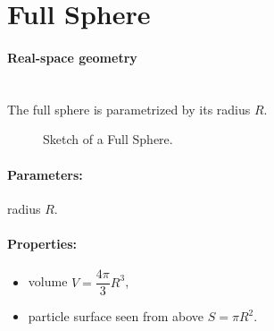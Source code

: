 
\newpage
\section{Full Sphere} 

\paragraph{Real-space geometry}\mbox{}\\
The full sphere is parametrized by its radius $R$. 

\begin{figure}[ht]
\hfill
{}
\hfill
{}
\hfill
\caption{Sketch of a Full Sphere.}
\label{fig:fullsphere}
\end{figure}

\FloatBarrier

\paragraph{Parameters:} radius $R$.

\paragraph{Properties:}
\begin{itemize}
\item volume $V = \dfrac{4\pi}{3}R^3$,
\item particle surface seen from above $S= \pi R^2$.
\end{itemize}


